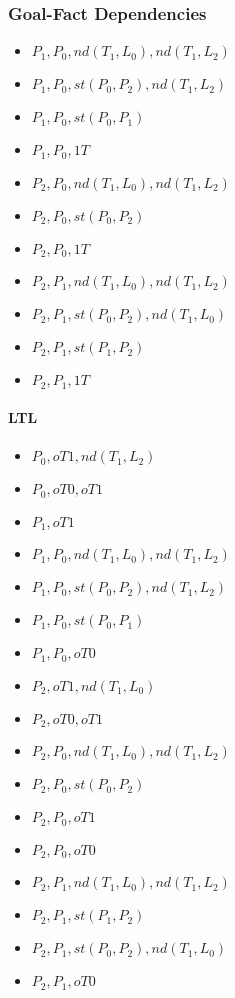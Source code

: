 \subsubsection{Goal-Fact Dependencies}
\begin{itemize}
	\item $P_1,P_0,nd(T_1,L_0),nd(T_1,L_2)$
	\item $P_1,P_0,st(P_0,P_2),nd(T_1,L_2)$
	\item $P_1,P_0,st(P_0,P_1)$
	\item $P_1,P_0,1T$
	\item $P_2,P_0,nd(T_1,L_0),nd(T_1,L_2)$
	\item $P_2,P_0,st(P_0,P_2)$
	\item $P_2,P_0,1T$
	\item $P_2,P_1,nd(T_1,L_0),nd(T_1,L_2)$
	\item $P_2,P_1,st(P_0,P_2),nd(T_1,L_0)$
	\item $P_2,P_1,st(P_1,P_2)$
	\item $P_2,P_1,1T$
\end{itemize}

\paragraph{LTL}
\begin{itemize}
	\item $P_0,oT1,nd(T_1,L_2)$
	\item $P_0,oT0,oT1$
	\item $P_1,oT1$
	\item $P_1,P_0,nd(T_1,L_0),nd(T_1,L_2)$
	\item $P_1,P_0,st(P_0,P_2),nd(T_1,L_2)$
	\item $P_1,P_0,st(P_0,P_1)$
	\item $P_1,P_0,oT0$
	\item $P_2,oT1,nd(T_1,L_0)$
	\item $P_2,oT0,oT1$
	\item $P_2,P_0,nd(T_1,L_0),nd(T_1,L_2)$
	\item $P_2,P_0,st(P_0,P_2)$
	\item $P_2,P_0,oT1$
	\item $P_2,P_0,oT0$
	\item $P_2,P_1,nd(T_1,L_0),nd(T_1,L_2)$
	\item $P_2,P_1,st(P_1,P_2)$
	\item $P_2,P_1,st(P_0,P_2),nd(T_1,L_0)$
	\item $P_2,P_1,oT0$
\end{itemize}

